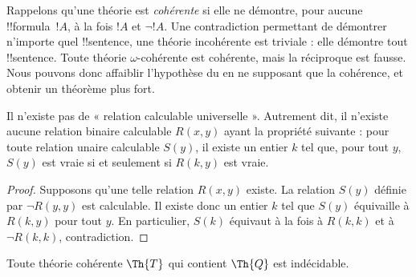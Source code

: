 \documentclass[../../../include/open-logic-section]{subfiles}
\begin{document}


\begin{explain}
Rappelons qu'une théorie est \emph{cohérente} si elle ne
démontre, pour aucune !!{formula}~$!A$, à la fois
$!A$ et $\lnot !A$. Une contradiction permettant de
démontrer n'importe quel !!{sentence}, une théorie
incohérente est triviale : elle démontre tout
!!{sentence}. Toute théorie $\omega$-cohérente est
cohérente, mais la réciproque est fausse. Nous pouvons
donc affaiblir l'hypothèse du
 en ne supposant que la
cohérence, et obtenir un théorème plus fort.
\end{explain}

\begin{lem}
Il n'existe pas de « relation calculable universelle ».
Autrement dit, il n'existe aucune relation binaire
calculable $R(x,y)$ ayant la propriété suivante : pour
toute relation unaire calculable $S(y)$, il existe un
entier $k$ tel que, pour tout $y$, $S(y)$ est vraie si
et seulement si $R(k,y)$ est vraie.
\end{lem}

\begin{proof}
Supposons qu'une telle relation $R(x,y)$ existe.
La relation $S(y)$ définie par $\lnot R(y,y)$ est
calculable. Il existe donc un entier $k$ tel que
$S(y)$ équivaille à $R(k,y)$ pour tout $y$.
En particulier, $S(k)$ équivaut à la fois à
$R(k,k)$ et à $\lnot R(k,k)$, contradiction.
\end{proof}

\begin{thm}
Toute théorie cohérente $\Th{T}$ qui contient
$\Th{Q}$ est indécidable.
\end{thm}
\end{document}
